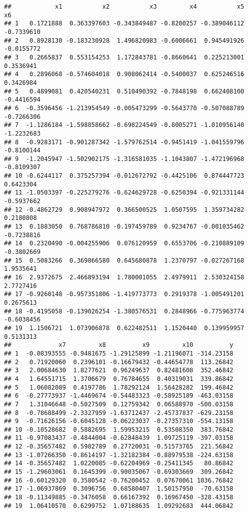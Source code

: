 \documentclass[
]{book}
\begin{document}
\begin{verbatim}
##            x1           x2           x3         x4           x5         x6
## 1   0.1721888  0.363397603 -0.343849487 -0.8200257 -0.389046112 -0.7339610
## 2   0.8928130 -0.183230928  1.496820983 -0.6006661  0.945491926 -0.0155772
## 3   0.2665837  0.553154253  1.172843781 -0.8660641  0.225213001  0.3536941
## 4   0.2896068 -0.574604018  0.908062414 -0.5400037  0.625246516  0.3426984
## 5   0.4899081  0.420540231  0.510490392 -0.7848198  0.662408100 -0.4416594
## 6  -0.3596456 -1.213954549 -0.005473299 -0.5643770 -0.507088789 -0.7266306
## 7  -1.1286184 -1.598858662 -0.698224549 -0.8005271 -1.010956140 -1.2232683
## 8  -0.9283171 -0.901287342 -1.579762514 -0.9451419 -1.041559796 -0.8100144
## 9  -1.2045947 -1.502902175 -1.316581035 -1.1043807 -1.472196968 -0.8109307
## 10 -0.6244117  0.375257394 -0.012672792 -0.4425106  0.874447723  0.6423304
## 11 -1.0503397 -0.225279276 -0.624629728 -0.6250394 -0.921331144 -0.5937662
## 12 -0.4862729  0.908947972  0.366500525  1.0507595  1.359734282  0.2180808
## 13  0.1883050  0.768786810 -0.197459789  0.9234767 -0.001035462 -0.7238816
## 14  0.2320490 -0.004255906  0.076120959  0.6553706 -0.210889109 -0.3802669
## 15  0.5083266  0.369866580  0.645680878  1.2370797 -0.027267168  1.9535641
## 16  2.9372675  2.466893194  1.780001055  2.4979911  2.530324158  2.7727416
## 17 -0.9260148 -0.957351806 -1.419773773  0.2919378 -1.005491201  0.2675613
## 18 -0.4195058 -0.139026254 -1.380576531  0.2848966 -0.775963774 -0.6038456
## 19  1.1506721  1.073906878  0.622482511  1.1520440  0.139959957  0.5131313
##             x7         x8          x9         x10          y
## 1  -0.08393555 -0.9481675 -1.29125899 -1.21196071 -314.23158
## 2   0.71920060  0.2396101 -0.16679432 -0.44654778  113.26842
## 3   2.00684630  1.8277621  0.96249637  0.82481608  352.46842
## 4   1.64551715  1.3706679  0.76784655  0.40319031  339.86842
## 5   1.06082089  0.4197786  1.78292124  1.56428282  199.46842
## 6  -0.27773937 -1.4469674 -0.54483323 -0.58925189 -463.03158
## 7   1.31046648 -0.5027509  0.12759342  0.06588970 -500.03158
## 8  -0.78688499 -2.3327959 -1.63712437 -2.45737837 -629.23158
## 9  -0.71626156 -0.6045128 -0.06223037 -0.27357310 -554.13158
## 10 -0.10528682  0.5882695  1.59953215  0.53508350  383.76842
## 11 -0.97083437 -0.4844004 -0.62848439  1.09725119 -397.03158
## 12 -0.35657482  0.5982789  0.27720031 -0.51573765  221.56842
## 13 -1.07266350 -0.8614197 -1.32182384 -0.88979538 -224.63158
## 14 -0.35657482  1.0220085 -0.62204969 -0.25411345   80.86842
## 15 -1.29603061  0.1645399 -0.90035067 -0.69303669  309.26842
## 16 -0.60129320  0.3580542 -0.76200452  0.07670061 1036.76842
## 17 -1.06937869  0.3096756  0.68580407  1.50157950  -70.63158
## 18 -0.11349885 -0.3476058  0.66167392  0.16967450 -328.43158
## 19  1.06410570  0.6299752  1.07188635  1.09292683  444.06842
\end{verbatim}
\end{document}
